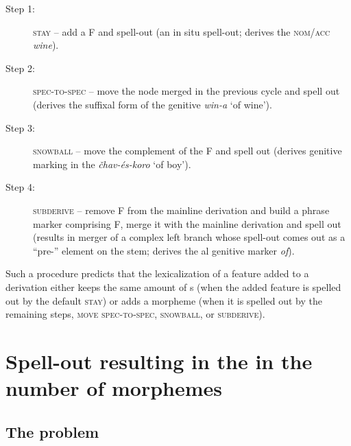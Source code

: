 \begin{description}
\item[Step 1:] \textsc{stay} -- add a  F and spell-out (an in situ spell-out; derives the  \textsc{nom/acc} \textit{wine}).
\item[Step 2:] \textsc{spec-to-spec} -- move the node merged in the previous cycle and spell out (derives the suffixal form of the  genitive \textit{win-a} `of wine').
\item[Step 3:] \textsc{snowball} -- move the complement of the  F and spell out (derives genitive marking in the  \textit{\v{c}hav-\'es-koro} `of boy').
\item[Step 4:] \textsc{subderive} -- remove F from the mainline derivation and build a phrase marker comprising F, merge it with the mainline derivation and spell out (results in merger of a complex left branch whose spell-out comes out as a ``pre-'' element on the stem; derives the  al genitive marker \textit{of}). 
\end{description}

Such a procedure predicts that the lexicalization of a feature added to a derivation either keeps the same amount of s (when the added feature is spelled out by the default \textsc{stay}) or adds a morpheme (when it is spelled out by the remaining steps, \textsc{move spec-to-spec}, \textsc{snowball}, or \textsc{subderive}). 

\section{Spell-out resulting in the  in the number of morphemes}\label{sec:cutback}

\subsection{The problem}

